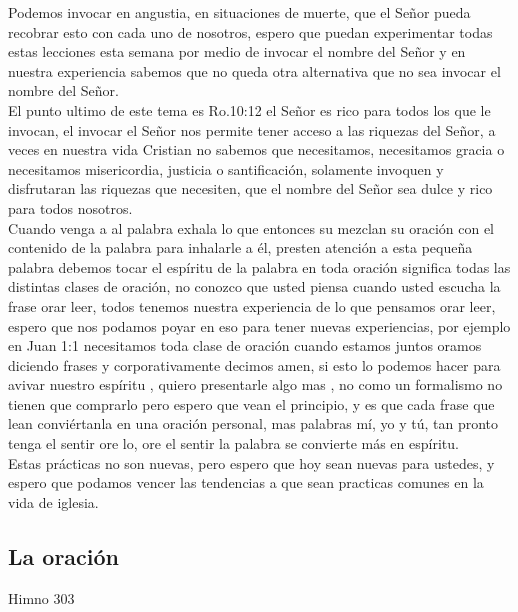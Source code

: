 \documentclass[12pt]{article}
\begin{document}
Podemos invocar en angustia, en situaciones de muerte, que el Señor pueda recobrar esto con cada uno de nosotros, espero que puedan experimentar todas estas lecciones esta semana por medio de invocar el nombre del Señor y en nuestra experiencia sabemos que no queda otra alternativa que no sea invocar el nombre del Señor.\\

El punto ultimo de este tema es Ro.10:12 el Señor es rico para todos los que le invocan, el invocar el Señor nos permite tener acceso a las riquezas del Señor, a veces en nuestra vida Cristian no sabemos que necesitamos, necesitamos gracia o necesitamos misericordia, justicia o santificación, solamente invoquen y disfrutaran las riquezas que necesiten, que el nombre del Señor sea dulce y rico para todos nosotros.\\

Cuando venga a al palabra exhala lo que entonces su mezclan su oración con el contenido de la palabra para inhalarle a él, presten atención a esta pequeña palabra debemos tocar el espíritu de la palabra en toda oración significa todas las distintas clases de oración, no conozco que usted piensa cuando usted escucha la frase orar leer, todos tenemos nuestra experiencia de lo que pensamos orar leer, espero que nos podamos poyar en eso para tener nuevas experiencias, por ejemplo en Juan 1:1 necesitamos toda clase de oración cuando estamos juntos oramos diciendo frases y corporativamente decimos amen, si esto lo podemos hacer para avivar nuestro espíritu , quiero presentarle algo mas , no como un formalismo no tienen que comprarlo pero espero que vean el principio, y es que cada frase que lean conviértanla en una oración personal, mas palabras mí, yo y tú, tan pronto tenga el sentir ore lo, ore el sentir la palabra se convierte más en espíritu.\\

Estas prácticas no son nuevas, pero espero que hoy sean nuevas para ustedes, y espero que podamos vencer las tendencias a que sean practicas comunes en la vida de iglesia. \\

\subsection*{La oración}

Himno 303\\
\end{document}

